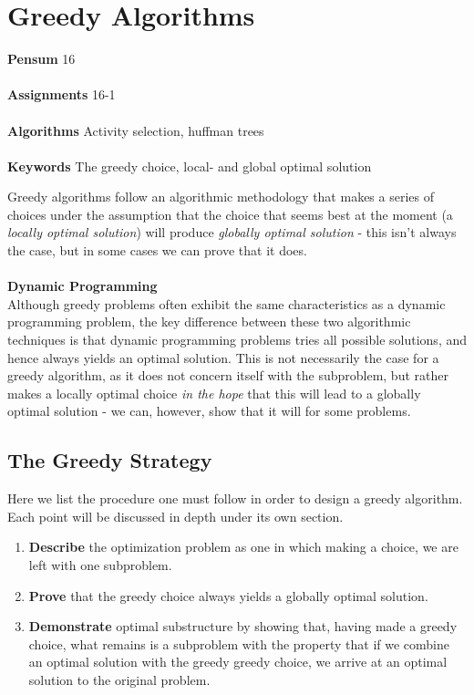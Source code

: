 
\chapter{Greedy Algorithms}
\label{ch:greedyalgorithms}

\textbf{Pensum} 16 \cite{clrs} \\\\
\textbf{Assignments} 16-1 \\\\
\textbf{Algorithms} Activity selection, huffman trees \\\\
\textbf{Keywords} The greedy choice, local- and global optimal solution
\vspace{1in}

\noindent Greedy algorithms follow an algorithmic methodology that makes a
series of choices under the assumption that the choice that seems best at the
moment (a \textit{locally optimal solution}) will produce \textit{globally
optimal solution} - this isn't always the case, but in some cases we can prove
that it does.
\\\\
\noindent \textbf{Dynamic Programming} \\
Although greedy problems often exhibit the same characteristics as a dynamic
programming problem, the key difference between these two algorithmic
techniques is that dynamic programming problems tries all possible solutions,
and hence always yields an optimal solution. This is not necessarily the case
for a greedy algorithm, as it does not concern itself with the subproblem, but
rather makes a locally optimal choice \textit{in the hope} that this will lead
to a globally optimal solution - we can, however, show that it will for some
problems.

\newpage
\section{The Greedy Strategy}
Here we list the procedure one must follow in order to design a greedy
algorithm. Each point will be discussed in depth under its own section.
\begin{enumerate}
	\item \textbf{Describe} the optimization problem as one in which making a
choice, we are left with one subproblem.
	\item \textbf{Prove} that the greedy choice always yields a globally
optimal solution.
	\item \textbf{Demonstrate} optimal substructure by showing that, having
made a greedy choice, what remains is a subproblem with the property that if
we combine an optimal solution with the greedy greedy choice, we arrive at an
optimal solution to the original problem.
\end{enumerate}


